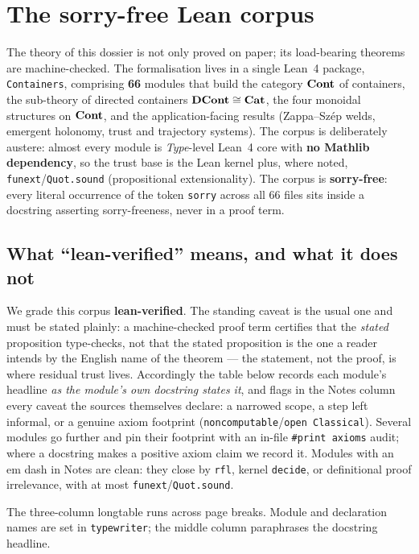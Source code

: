 \chapter{The sorry-free Lean corpus}
\label{ch:corpus}

The theory of this dossier is not only proved on paper; its load-bearing
theorems are machine-checked. The formalisation lives in a single Lean~4
package, \texttt{Containers}, comprising \textbf{66} modules that build the
category $\mathbf{Cont}$ of containers, the sub-theory of directed containers
$\mathbf{DCont} \cong \mathbf{Cat}$, the four monoidal structures on $\mathbf{Cont}$, and the
application-facing results (Zappa--Sz\'ep welds, emergent holonomy, trust and
trajectory systems). The corpus is deliberately austere: almost every module is
\emph{Type}-level Lean~4 core with \textbf{no Mathlib dependency}, so the trust
base is the Lean kernel plus, where noted, \texttt{funext}/\texttt{Quot.sound}
(propositional extensionality). The corpus is \textbf{sorry-free}: every literal
occurrence of the token \texttt{sorry} across all 66 files sits inside a
docstring asserting sorry-freeness, never in a proof term.

\section{What ``lean-verified'' means, and what it does not}

We grade this corpus \textbf{lean-verified}. The standing caveat is the usual
one and must be stated plainly: a machine-checked proof term certifies that the
\emph{stated} proposition type-checks, not that the stated proposition is the
one a reader intends by the English name of the theorem --- the statement, not
the proof, is where residual trust lives. Accordingly the table below records
each module's headline \emph{as the module's own docstring states it}, and flags
in the Notes column every caveat the sources themselves declare: a narrowed
scope, a step left informal, or a genuine axiom footprint
(\texttt{noncomputable}/\texttt{open Classical}). Several modules go further and
pin their footprint with an in-file \texttt{\#print axioms} audit; where a
docstring makes a positive axiom claim we record it. Modules with an em dash in
Notes are clean: they close by \texttt{rfl}, kernel \texttt{decide}, or
definitional proof irrelevance, with at most \texttt{funext}/\texttt{Quot.sound}.

The three-column longtable runs across page breaks. Module and declaration names
are set in \texttt{typewriter}; the middle column paraphrases the docstring
headline.

